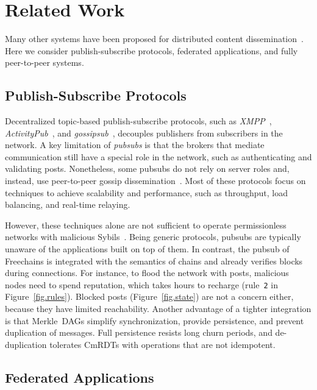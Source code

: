 \documentclass[10pt,journal,compsoc]{IEEEtran}
\newcommand{\FC}       {Freechains\xspace}
\begin{document}
\section{Related Work}
\label{sec.related}


Many other systems have been proposed for distributed content
dissemination~\cite{p2p.survey,p2p.ecosystem}.
Here we consider publish-subscribe protocols, federated applications, and fully
peer-to-peer systems.

\subsection{Publish-Subscribe Protocols}

Decentralized topic-based publish-subscribe protocols, such as
    \emph{XMPP}~\cite{pubsub.xmpp},
    \emph{ActivityPub}~\cite{pubsub.activitypub}, and
    \emph{gossipsub}~\cite{pubsub.gossipsub},
decouples publishers from subscribers in the network.
%
A key limitation of \emph{pubsubs} is that the brokers that mediate
communication still have a special role in the network, such as authenticating
and validating posts.
%
Nonetheless, some pubsubs do not rely on server roles and, instead, use
peer-to-peer gossip dissemination~\cite{pubsub.tera,pubsub.rappel,pubsub.stan,pubsub.vitis,pubsub.gossipsub,pubsub.rappel}.
Most of these protocols focus on techniques to achieve scalability and
performance, such as throughput, load balancing, and real-time relaying.

However, these techniques alone are not sufficient to operate permissionless
networks with malicious Sybils~\cite{pubsub.gossipsub2}.
Being generic protocols, pubsubs are typically unaware of the applications
built on top of them.
In contrast, the pubsub of \FC is integrated with the semantics of chains and
already verifies blocks during connections.
For instance, to flood the network with posts, malicious nodes need to spend
reputation, which takes hours to recharge (rule~\texttt{2} in
Figure~\ref{fig.rules}).
Blocked posts (Figure~\ref{fig.state}) are not a concern either, because they
have limited reachability.
Another advantage of a tighter integration is that Merkle~DAGs simplify
synchronization, provide persistence, and prevent duplication of messages.
Full persistence resists long churn periods, and de-duplication tolerates
CmRDTs with operations that are not idempotent.

\subsection{Federated Applications}
\end{document}
